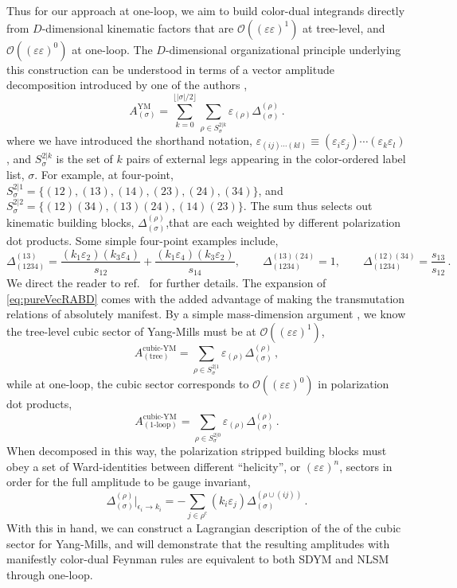\documentclass[11pt,letter]{article}
\def\be{\begin{equation}}
\def\ee{\end{equation}}
\begin{document}
Thus for our approach at one-loop, we aim to build color-dual integrands directly from $D$-dimensional kinematic factors that are $\mathcal{O}((\varepsilon\varepsilon)^1)$ at tree-level, and $\mathcal{O}((\varepsilon\varepsilon)^0)$ at one-loop. The $D$-dimensional organizational principle underlying this construction can be understood in terms of a vector amplitude decomposition introduced by one of the authors \cite{Pavao:2022kog},
\begin{equation}\label{eq:pureVecRABD}
A_{(\sigma)}^{\text{YM}} = \sum_{k=0}^{\lfloor |\sigma|/2\rfloor}\sum_{\rho \in S^{2|k}_{\sigma}}\varepsilon_{(\rho)} \Delta_{(\sigma)}^{(\rho)}\,.
\end{equation}
where we have introduced the shorthand notation, $\varepsilon_{(ij)\cdots (kl)} \equiv (\varepsilon_i \varepsilon_j)\cdots (\varepsilon_k \varepsilon_l)$, and  $S^{2|k}_{\sigma}$ is the set of $k$ pairs of external legs appearing in the color-ordered label list, $\sigma$. For example, at four-point, $S^{2|1}_{\sigma} =  \{(12),(13),(14),(23),(24),(34)\}$, and $S^{2|2}_{\sigma} =  \{(12)(34),(13)(24),(14)(23)\}$. The sum thus selects out kinematic building blocks, $\Delta_{(\sigma)}^{(\rho)}$,that are each weighted by different polarization dot products. Some simple four-point examples include, 
\be
\Delta^{(13)}_{(1234)} =\frac{(k_1 \varepsilon_2)(k_{3} \varepsilon_4)}{s_{12}}+\frac{(k_1 \varepsilon_4)(k_{3} \varepsilon_2)}{s_{14}}, \qquad \Delta^{(13)(24)}_{(1234)} =1, \qquad \Delta^{(12)(34)}_{(1234)} =\frac{s_{13}}{s_{12}}\,. 
\ee
We direct the reader to ref.~\cite{Pavao:2022kog} for further details. The expansion of \cref{eq:pureVecRABD} comes with the added advantage of making the transmutation relations of \cite{Cheung:2017ems} absolutely manifest. By a simple mass-dimension argument \cite{ElvangHuangReview}, we know the tree-level cubic sector of Yang-Mills must be at
$\mathcal{O}((\varepsilon\varepsilon)^1)$,
\begin{equation}
A_{(\text{tree})}^{\text{cubic-YM}} = \sum_{\rho \in S^{2|1}_{\sigma}}\varepsilon_{(\rho)} \Delta_{(\sigma)}^{(\rho)}\, ,
\end{equation}
while at one-loop, the cubic sector corresponds to
$\mathcal{O}((\varepsilon\varepsilon)^0)$ in polarization dot
products,
\begin{equation}
A_{(\text{1-loop})}^{\text{cubic-YM}} = \sum_{\rho \in S^{2|0}_{\sigma}}\varepsilon_{(\rho)} \Delta_{(\sigma)}^{(\rho)}\,.
\end{equation}
When decomposed in this way, the polarization stripped building blocks
must obey a set of Ward-identities between different ``helicity'', or
$(\varepsilon \varepsilon)^n$, sectors in order for the full amplitude
to be gauge invariant,
 \begin{equation}\label{eq:GIrelA}
\Delta_{(\sigma)}^{(\rho)}\Big|_{\epsilon_i\rightarrow k_i} =-
\sum_{j \in \rho^c} (k_i \varepsilon_j)\Delta_{(\sigma )}^{(\rho\cup (ij))} \,.
\end{equation}
With this in hand, we can construct a Lagrangian description of the of
the cubic sector for Yang-Mills, and will demonstrate that the
resulting amplitudes with manifestly color-dual Feynman rules are
equivalent to both SDYM and NLSM through one-loop.
\end{document}
